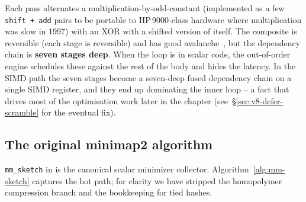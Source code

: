 Each pass alternates a multiplication-by-odd-constant (implemented as
a few \texttt{shift\,+\,add} pairs to be portable to
HP\,9000-class hardware where multiplication was slow in 1997) with
an XOR with a shifted version of itself.  The composite is
reversible (each stage is reversible) and has good
avalanche~\cite{wang_inthash}, but the dependency chain is
\textbf{seven stages deep}.  When the loop is in scalar code, the
out-of-order engine schedules these against the rest of the body and
hides the latency.  In the SIMD path the seven stages become a
seven-deep fused dependency chain on a single SIMD register, and they
end up dominating the inner loop -- a fact that drives most of the
optimisation work later in the chapter
(see~\S\ref{sec:v8-defer-scramble} for the eventual fix).

\subsection{The original minimap2 algorithm}

\texttt{mm\_sketch} in
 is the canonical scalar
minimizer collector.  Algorithm~\ref{alg:mm-sketch} captures the hot
path; for clarity we have stripped the homopolymer compression
branch and the bookkeeping for tied hashes.


